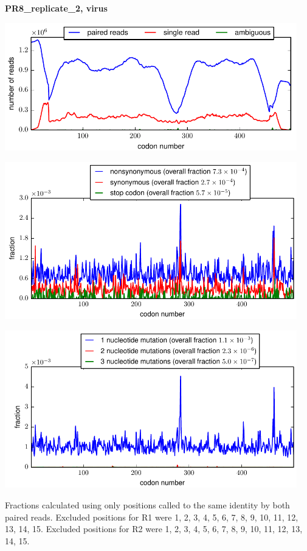 \documentclass[10pt,letterpaper]{article}
\begin{document}
\centerline{\Large \bf PR8\_replicate\_2, virus}
\vspace{0.1in}

\centerline{\includegraphics[width=5in]{PR8_replicate_2_virus_codondepth.pdf}}
\vspace{0.1in}

\centerline{\includegraphics[width=5in]{PR8_replicate_2_virus_syn-ns-dist.pdf}}
\vspace{0.1in}

\centerline{\includegraphics[width=5in]{PR8_replicate_2_virus_nmutspercodon-dist.pdf}}
\vspace{0.1in}

Fractions calculated using only positions called to the same identity by both paired reads.  Excluded positions for R1 were 1, 2, 3, 4, 5, 6, 7, 8, 9, 10, 11, 12, 13, 14, 15. 
 Excluded positions for R2 were 1, 2, 3, 4, 5, 6, 7, 8, 9, 10, 11, 12, 13, 14, 15. 
\end{document}

